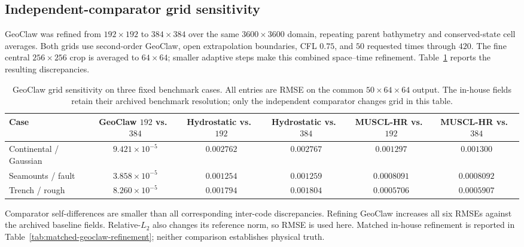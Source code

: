 \FloatBarrier
\subsection{Independent-comparator grid sensitivity}
\label{app:geoclaw-grid-sensitivity}

GeoClaw was refined from $192\times192$ to $384\times384$ over the same $3600\times3600$ domain, repeating parent bathymetry and conserved-state cell averages. Both grids use second-order GeoClaw, open extrapolation boundaries, CFL $0.75$, and $50$ requested times through $420$. The fine central $256\times256$ crop is averaged to $64\times64$; smaller adaptive steps make this combined space--time refinement. Table~\ref{tab:app-geoclaw-grid-sensitivity} reports the resulting discrepancies.

\begin{table}[pos=!htbp]
\centering
\caption{GeoClaw grid sensitivity on three fixed benchmark cases. All entries are RMSE on the common $50\times64\times64$ output. The in-house fields retain their archived benchmark resolution; only the independent comparator changes grid in this table.}
\label{tab:app-geoclaw-grid-sensitivity}
\small
\setlength{\tabcolsep}{3pt}
\begin{tabular}{lccccc}
    \toprule
    Case & \shortstack{GeoClaw\\$192$ vs.\ $384$} & \shortstack{Hydrostatic\\vs.\ $192$} & \shortstack{Hydrostatic\\vs.\ $384$} & \shortstack{MUSCL-HR\\vs.\ $192$} & \shortstack{MUSCL-HR\\vs.\ $384$} \\
    \midrule
    Continental / Gaussian & $9.421\times10^{-5}$ & $0.002762$ & $0.002767$ & $0.001297$ & $0.001300$ \\
    Seamounts / fault & $3.858\times10^{-5}$ & $0.001254$ & $0.001259$ & $0.0008091$ & $0.0008092$ \\
    Trench / rough & $8.260\times10^{-5}$ & $0.001794$ & $0.001804$ & $0.0005706$ & $0.0005907$ \\
    \bottomrule
\end{tabular}
\end{table}

Comparator self-differences are smaller than all corresponding inter-code discrepancies. Refining GeoClaw increases all six RMSEs against the archived baseline fields. Relative-$L_2$ also changes its reference norm, so RMSE is used here. Matched in-house refinement is reported in Table~\ref{tab:matched-geoclaw-refinement}; neither comparison establishes physical truth.

